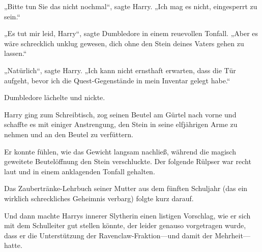 „Bitte tun Sie das nicht nochmal“, sagte Harry. „Ich mag es nicht, eingesperrt zu sein.“

„Es tut mir leid, Harry“, sagte Dumbledore in einem reuevollen Tonfall. „Aber es wäre schrecklich unklug gewesen, dich ohne den Stein deines Vaters gehen zu lassen.“

„Natürlich“, sagte Harry. „Ich kann nicht ernsthaft erwarten, dass die Tür aufgeht, bevor ich die Quest-Gegenstände in mein Inventar gelegt habe.“

Dumbledore lächelte und nickte.

Harry ging zum Schreibtisch, zog seinen Beutel am Gürtel nach vorne und schaffte es mit einiger Anstrengung, den Stein in seine elfjährigen Arme zu nehmen und an den Beutel zu verfüttern.

Er konnte fühlen, wie das Gewicht langsam nachließ, während die magisch geweitete Beutelöffnung den Stein verschluckte. Der folgende Rülpser war recht laut und in einem anklagenden Tonfall gehalten.

Das Zaubertränke-Lehrbuch seiner Mutter aus dem fünften Schuljahr (das ein wirklich schreckliches Geheimnis verbarg) folgte kurz darauf.

Und dann machte Harrys innerer Slytherin einen listigen Vorschlag, wie er sich mit dem Schulleiter gut stellen könnte, der leider genauso vorgetragen wurde, dass er die Unterstützung der Ravenclaw-Fraktion—und damit der Mehrheit—hatte.

